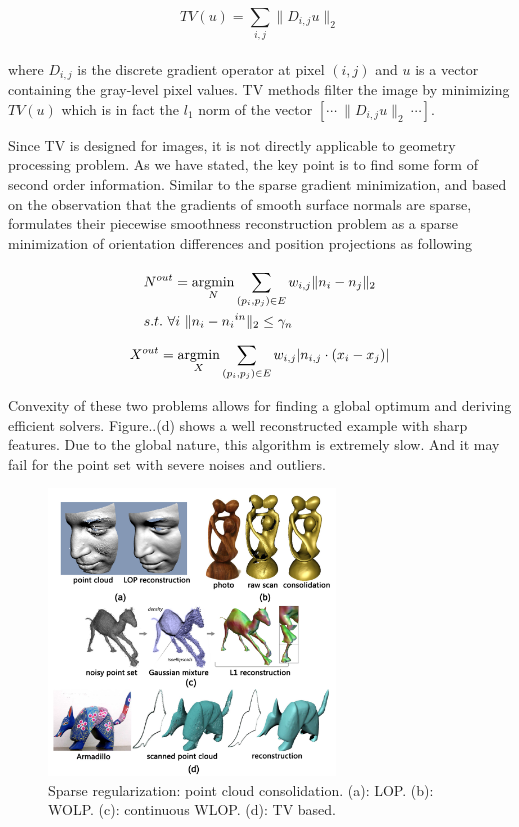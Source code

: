 \small{
\begin{equation}
 \label{eq:TV}
 TV(u)=\sum_{i,j}^{}\|D_{i,j}u\|_2
\end{equation}
}
\\
where $D_{i,j}$ is the discrete gradient operator at pixel $(i,j)$ and $u$ is a vector containing the gray-level pixel values. TV methods filter the image by minimizing $TV(u)$ which is in fact the $l_1$ norm of the vector $[\cdots~\|D_{i,j}u\|_2~\cdots]$.

Since TV is designed for images, it is not directly applicable to geometry processing problem. As we have stated, the key point is to find some form of second order information. Similar to the sparse gradient minimization, and based on the observation that the gradients of smooth surface normals are sparse, \cite{avron2010L1} formulates their piecewise smoothness reconstruction problem as a sparse minimization of orientation differences and position projections as following

\small{
\begin{equation}
 \label{eq:L1reconstruction}
 \begin{aligned}
 &N^{out} =\mathop{\argmin}_{N} \sum_{(p_{i},p_{j})\in E}^{} w_{i,j}\|n_{i}-n_{j}\|_2\\
 &s.t.~\forall i~\|n_{i}-{n_{i}}^{in}\|_2\le \gamma_{n} %
 \end{aligned}
\end{equation}
}
\small{
\begin{equation}
 \label{eq:L1reconstruction}
 X^{out} = \mathop{\operatorname*{argmin}}_{X} \sum_{(p_{i},p_{j})\in E}^{} w_{i,j}|n_{i,j}\cdot (x_{i}-x_{j})|
\end{equation}
}

Convexity of these two problems allows for finding a global optimum and deriving efficient solvers. Figure..(d) shows a well reconstructed example with sharp features. Due to the global nature, this algorithm is extremely slow. And it may fail for the point set with severe noises and outliers.

\begin{figure}[ht]
  \centering
  \includegraphics[width=3in]{images/reconstruction_L1}
  \caption{Sparse regularization: point cloud consolidation. (a): LOP\cite{lipman2007parameterization}. (b): WOLP\cite{huang2009consolidation}. (c): continuous WLOP\cite{preiner2014CPF}. (d): TV based\cite{avron2010L1}.}
\end{figure}